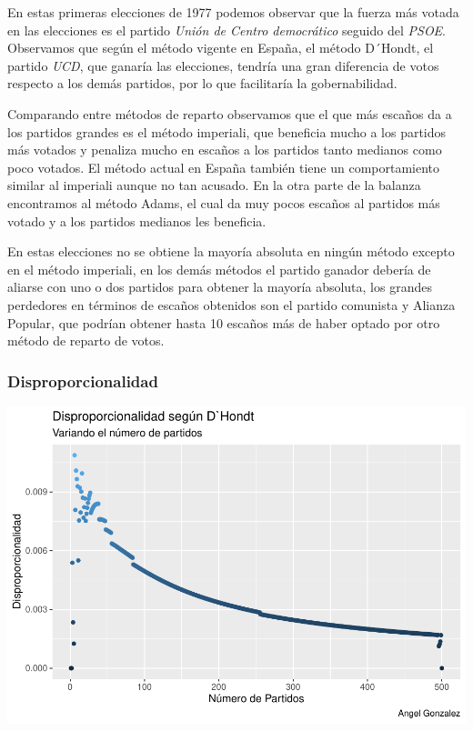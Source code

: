 \documentclass[12pt,a4paper,]{book}
\numberwithin{dummy}{section}
\theoremstyle{ocrenumbox}
\theoremstyle{blacknumex}
\theoremstyle{blacknumbox}
\theoremstyle{ocrenum}
\theoremstyle{ocrenum}
\begin{document}
En estas primeras elecciones de 1977 podemos observar que la fuerza más
votada en las elecciones es el partido \emph{Unión de Centro
democrático} seguido del \emph{PSOE}. Observamos que según el método
vigente en España, el método D´Hondt, el partido \emph{UCD}, que ganaría
las elecciones, tendría una gran diferencia de votos respecto a los
demás partidos, por lo que facilitaría la gobernabilidad.

Comparando entre métodos de reparto observamos que el que más escaños da
a los partidos grandes es el método imperiali, que beneficia mucho a los
partidos más votados y penaliza mucho en escaños a los partidos tanto
medianos como poco votados. El método actual en España también tiene un
comportamiento similar al imperiali aunque no tan acusado. En la otra
parte de la balanza encontramos al método Adams, el cual da muy pocos
escaños al partidos más votado y a los partidos medianos les beneficia.

En estas elecciones no se obtiene la mayoría absoluta en ningún método
excepto en el método imperiali, en los demás métodos el partido ganador
debería de aliarse con uno o dos partidos para obtener la mayoría
absoluta, los grandes perdedores en términos de escaños obtenidos son el
partido comunista y Alianza Popular, que podrían obtener hasta 10
escaños más de haber optado por otro método de reparto de votos.

\hypertarget{disproporcionalidad}{%
\subsubsection{Disproporcionalidad}\label{disproporcionalidad}}

\begin{center}\includegraphics[width=0.95\linewidth]{figurasR/unnamed-chunk-12-1} \end{center}
\end{document}
